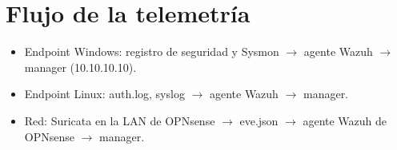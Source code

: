 \section{Flujo de la telemetría}
\begin{itemize}[leftmargin=*,itemsep=0pt]
  \item Endpoint Windows: registro de seguridad y Sysmon $\rightarrow$ agente Wazuh $\rightarrow$ manager (10.10.10.10).
  \item Endpoint Linux: auth.log, syslog $\rightarrow$ agente Wazuh $\rightarrow$ manager.
  \item Red: Suricata en la LAN de OPNsense $\rightarrow$ eve.json $\rightarrow$ agente Wazuh de OPNsense $\rightarrow$ manager.
\end{itemize}


